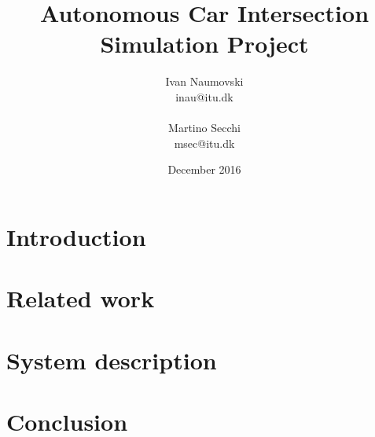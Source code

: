 \documentclass{article}
\begin{document}
\title{Autonomous Car Intersection Simulation Project}

\author{
   Ivan Naumovski\\
    {inau@itu.dk}\\
    \\
   Martino Secchi\\
    {msec@itu.dk}\\
}
\date{December 2016}

\maketitle
\clearpage
\tableofcontents
\clearpage


\abstract{

}
\section{Introduction}


\section{Related work}


\section{System description}


\section{Conclusion}



\end{document}
